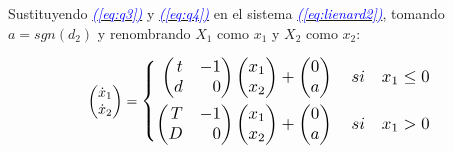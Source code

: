 \documentclass[12pt,a4paper]{report} %
\newcommand{\eref}[1]{\hyperref[#1]{\textcolor{blue}{\textit{(\ref*{#1})}}}}
\begin{document}
	Sustituyendo \eref{eq:q3} y \eref{eq:q4} en el sistema \eref{eq:lienard2}, tomando $a=sgn(d_2)$ y renombrando $X_1$ como $x_1$ y $X_2$ como $x_2$:
	
	
	\begin{equation}
		\begin{pmatrix*}[r]
			\dot{x}_1 \\ \dot{x}_2
		\end{pmatrix*}=
		\label{eq:lienardfinal}
		\scalebox{1.2}{$\displaystyle
			\left\{
			\begin{aligned}
				\begin{pmatrix*}[r]
					t & -1\\
					d & 0
				\end{pmatrix*}\begin{pmatrix*}[r]
					x_1 \\ x_2
				\end{pmatrix*}+\begin{pmatrix}
					0\\a
				\end{pmatrix} \quad si \quad x_1\leq 0 \\
				\begin{pmatrix*}[r]
					T & -1\\
					D & 0
				\end{pmatrix*}\begin{pmatrix*}[r]
					x_1 \\ x_2
				\end{pmatrix*}+\begin{pmatrix}
					0\\a
				\end{pmatrix} \quad si \quad x_1 > 0
			\end{aligned}
			\right. 
			$}
	\end{equation}\smallskip
	
\end{document}
